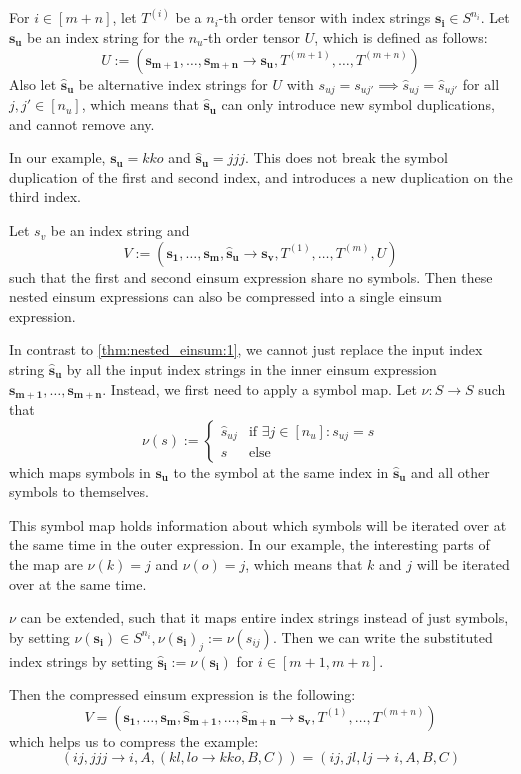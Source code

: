 \begin{theorem}
    \label{thm:nested_einsum:2}

    For $i \in [m + n]$, let $T^{(i)}$ be a $n_i$-th order tensor with index strings $\bm{s_i} \in S^{n_i}$.
    Let $\bm{s_u}$ be an index string for the $n_u$-th order tensor $U$, which is defined as follows:
    $$U := (\bm{s_{m + 1}},\dots,\bm{s_{m + n}} \rightarrow \bm{s_u}, T^{(m + 1)},\dots,T^{(m + n)})$$
    Also let $\bm{\hat{s}_u}$ be alternative index strings for $U$ with $s_{uj} = s_{uj'} \implies \hat{s}_{uj} = \hat{s}_{uj'}$ for all $j, j' \in [n_u]$,
    which means that $\bm{\hat{s}_u}$ can only introduce new symbol duplications, and cannot remove any.

    In our example, $\bm{s_u} = kko$ and $\bm{\hat{s}_u} = jjj$.
    This does not break the symbol duplication of the first and second index,
    and introduces a new duplication on the third index.

    Let $s_v$ be an index string and
    $$V := (\bm{s_1},\dots,\bm{s_m}, \bm{\hat{s}_u} \rightarrow \bm{s_v}, T^{(1)},\dots,T^{(m)}, U)$$
    such that the first and second einsum expression share no symbols.
    Then these nested einsum expressions can also be compressed into a single einsum expression.

    In contrast to \autoref{thm:nested_einsum:1}, we cannot just replace the input index string $\bm{\hat{s}_u}$ by all the input index strings in the inner einsum expression $\bm{s_{m + 1}},\dots,\bm{s_{m + n}}$.
    Instead, we first need to apply a symbol map.
    Let $\nu: S \rightarrow S$ such that
    $$\nu(s) := \begin{cases}
            \hat{s}_{uj} & \text{if }\exists j \in [n_u]: s_{uj} = s \\
            s            & \text{else}
        \end{cases}$$
    which maps symbols in $\bm{s_u}$ to the symbol at the same index in $\bm{\hat{s}_u}$ and all other symbols to themselves.

    This symbol map holds information about which symbols will be iterated over at the same time in the outer expression.
    In our example, the interesting parts of the map are $\nu(k) = j$ and $\nu(o) = j$, which means that $k$ and $j$ will be iterated over at the same time.

    $\nu$ can be extended, such that it maps entire index strings instead of just symbols, by setting $\nu(\bm{s_i}) \in S^{n_i}, \nu(\bm{s_i})_j := \nu(s_{ij})$.
    Then we can write the substituted index strings by setting $\bm{\hat{s}_i} := \nu(\bm{s_i})$ for $i \in [m + 1, m + n]$.

    Then the compressed einsum expression is the following:
    $$V = (\bm{s_1},\dots,\bm{s_m}, \bm{\hat{s}_{m + 1}}, \dots, \bm{\hat{s}_{m + n}} \rightarrow \bm{s_v}, T^{(1)},\dots,T^{(m + n)})$$
    which helps us to compress the example:
    $$(ij, jjj \rightarrow i, A, (kl, lo \rightarrow kko, B, C)) = (ij, jl, lj \rightarrow i, A, B, C)$$
\end{theorem}
